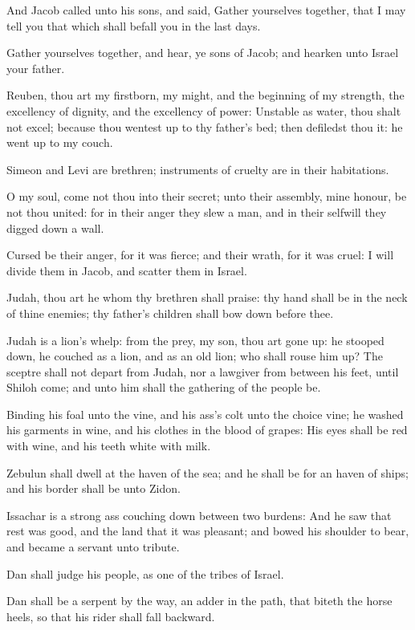 \Chapter
\Verse And Jacob called unto his sons, and said, Gather yourselves together, that I may tell you that which shall befall you in the last days.

\Verse Gather yourselves together, and hear, ye sons of Jacob; and hearken unto Israel your father.

\Verse Reuben, thou art my firstborn, my might, and the beginning of my strength, the excellency of dignity, and the excellency of power: \Verse Unstable as water, thou shalt not excel; because thou wentest up to thy father's bed; then defiledst thou it: he went up to my couch.

\Verse Simeon and Levi are brethren; instruments of cruelty are in their habitations.

\Verse O my soul, come not thou into their secret; unto their assembly, mine honour, be not thou united: for in their anger they slew a man, and in their selfwill they digged down a wall.

\Verse Cursed be their anger, for it was fierce; and their wrath, for it was cruel: I will divide them in Jacob, and scatter them in Israel.

\Verse Judah, thou art he whom thy brethren shall praise: thy hand shall be in the neck of thine enemies; thy father's children shall bow down before thee.

\Verse Judah is a lion's whelp: from the prey, my son, thou art gone up: he stooped down, he couched as a lion, and as an old lion; who shall rouse him up?  \Verse The sceptre shall not depart from Judah, nor a lawgiver from between his feet, until Shiloh come; and unto him shall the gathering of the people be.

\Verse Binding his foal unto the vine, and his ass's colt unto the choice vine; he washed his garments in wine, and his clothes in the blood of grapes: \Verse His eyes shall be red with wine, and his teeth white with milk.

\Verse Zebulun shall dwell at the haven of the sea; and he shall be for an haven of ships; and his border shall be unto Zidon.

\Verse Issachar is a strong ass couching down between two burdens: \Verse And he saw that rest was good, and the land that it was pleasant; and bowed his shoulder to bear, and became a servant unto tribute.

\Verse Dan shall judge his people, as one of the tribes of Israel.

\Verse Dan shall be a serpent by the way, an adder in the path, that biteth the horse heels, so that his rider shall fall backward.

